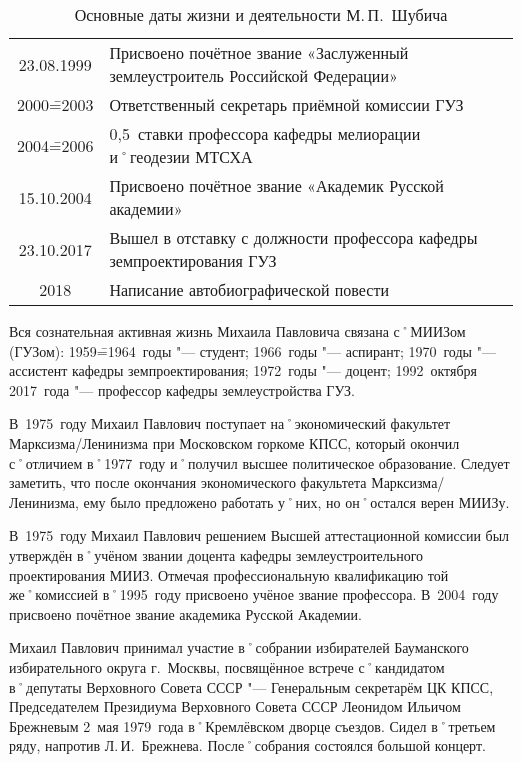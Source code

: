 \begin{table}[t]
{\begin{tabularx}{\textwidth}{cX}
		23.08.1999	&	Присвоено почётное звание «Заслуженный землеустроитель Российской Федерации»		\\
		2000\==2003		&	Ответственный секретарь приёмной комиссии ГУЗ										\\
		2004\==2006		&	0,5~ставки профессора кафедры мелиорации и˚геодезии МТСХА							\\
		15.10.2004	&	Присвоено почётное звание «Академик Русской академии»									\\
		23.10.2017	&	Вышел в отставку с должности профессора кафедры земпроектирования ГУЗ									\\
		2018				&	Написание автобиографической повести									\\
	\end{tabularx}
}
\caption{Основные даты жизни и деятельности М.\,П.~Шубича}
\label{tab:biograf}  
\end{table}

\FloatBarrier

Вся сознательная активная жизнь Михаила Павловича связана с˚МИИЗом (ГУЗом): 1959\==1964~годы "--- студент; 1966~годы "--- аспирант; 1970~годы "--- ассистент кафедры земпроектирования; 1972~годы "--- доцент; 1992~октября 2017~года "--- профессор кафедры землеустройства ГУЗ.

В~1975~году Михаил Павлович поступает на˚экономический факультет Марксизма\-/Ленинизма при Московском горкоме КПСС, который окончил с˚отличием в˚1977~году и˚получил высшее политическое образование. Следует заметить, что после окончания экономического факультета Марксизма\-/Ленинизма, ему было предложено работать у˚них, но он˚остался верен МИИЗу.

В~1975~году Михаил Павлович решением Высшей аттестационной комиссии был утверждён в˚учёном звании доцента кафедры землеустроительного проектирования МИИЗ. Отмечая профессиональную квалификацию той же˚комиссией в˚1995~году присвоено учёное звание профессора. В~2004~году присвоено почётное звание академика Русской Академии.

Михаил Павлович принимал участие в˚собрании избирателей Бауманского избирательного округа г.~Москвы, посвящённое встрече с˚кандидатом в˚депутаты Верховного Совета СССР "--- Генеральным секретарём ЦК КПСС, Председателем Президиума Верховного Совета СССР Леонидом Ильичом Брежневым 2~мая 1979~года в˚Кремлёвском дворце съездов. Сидел в˚третьем ряду, напротив Л.\,И.~Брежнева. После˚собрания состоялся большой концерт. 

